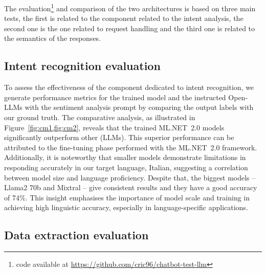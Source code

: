 





The evaluation\footnote{code available at \url{https://github.com/cric96/chatbot-test-llm}} and comparison of the two architectures is based on 
three main tests, the first is related to the component related to the intent analysis, the second one is the one related to request handling and the third one is related to the semantics of the responses. 
%
\subsection{Intent recognition evaluation}
%
To assess the effectiveness of the component dedicated to intent recognition, 
we generate performance metrics for the trained model and the instructed Open-LLMs with the sentiment analysis prompt by comparing the output labels with our ground truth. 
%
The comparative analysis, as illustrated in Figure~\ref{fig:cm1,fig:cm2}, reveals that the trained ML.NET~2.0 models significantly outperform other (LLMs). 
%
This superior performance can be attributed to the fine-tuning phase performed with the ML.NET~2.0 framework. 
Additionally, it is noteworthy that smaller models demonstrate limitations in responding accurately in our target language, Italian, suggesting a correlation between model size and language proficiency.
%
Despite that, the biggest models -- Llama2 70b and Mixtral -- give consistent results and they have a good accuracy of 74\%.
This insight emphasises the importance of model scale and training in achieving high linguistic accuracy, 
especially in language-specific applications.

\subsection{Data extraction evaluation}

